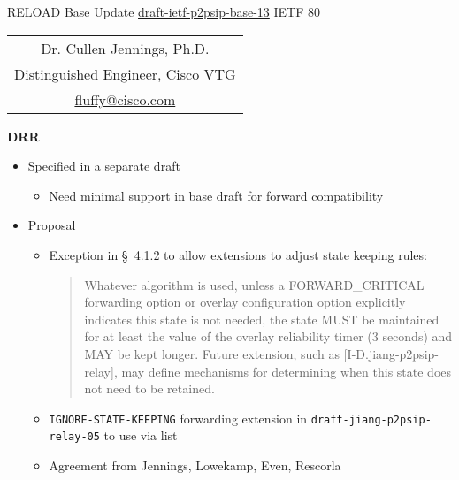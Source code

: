 \documentclass[helvetica]{seminar}
\newcommand{\heading}[1]{%
  \begin{center} 
    \large\bf 
    #1 
  \end{center} 
  \vspace{.4 in}}
\begin{document}
\begin{slide}
\begin{center}
\vspace{1 in}
\LARGE{{\bf}RELOAD Base Update}
\large{\url{draft-ietf-p2psip-base-13}}
\vspace{.2in}
\large{{IETF 80}} \\
\vspace{3em}
\large{
\begin{tabular}{c}
Dr. Cullen Jennings, Ph.D. \\
Distinguished Engineer, Cisco VTG\\
\url{fluffy@cisco.com}
\end{tabular}
}
\end{center}

\end{slide}


\centerslidesfalse 





\begin{slide}
\heading{DRR}

\vspace{-.4in}
\begin{itemize}
\item Specified in a separate draft
  \begin{itemize}
  \item Need minimal support in base draft for forward compatibility
  \end{itemize}

\item Proposal
  \begin{itemize}
  \item Exception in \S\ 4.1.2 to allow extensions to adjust state keeping rules:
    \small{
    \begin{quote}
      Whatever algorithm is used, unless a FORWARD\_CRITICAL forwarding
      option or overlay configuration option explicitly indicates this
      state is not needed, the state MUST be maintained for at least the
      value of the overlay reliability timer (3 seconds) and MAY be kept
      longer.  Future extension, such as [I-D.jiang-p2psip-relay], may
      define mechanisms for determining when this state does not need to be
      retained.
 \end{quote}
}
  \item \verb^IGNORE-STATE-KEEPING^ forwarding extension in \verb^draft-jiang-p2psip-relay-05^ to use via list
  \item Agreement from Jennings, Lowekamp, Even, Rescorla
  \end{itemize}
\end{itemize}
                

\end{slide}
\end{document}
